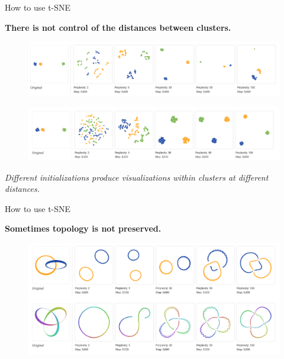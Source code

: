 \documentclass[10pt]{beamer}
\theoremstyle{definition}
\newcommand{\1}{\mathbbm{1}}
\begin{document}
\begin{frame}{How to use t-SNE}
  \begin{center}
    \bf
    There is not control of the distances between clusters.
  \end{center}
  \begin{figure}[h]
    \centering
    \includegraphics[scale=0.2, trim=2cm 0 0 2cm]{./pic/cluster_dist1.png}
  \end{figure}
  \begin{figure}[h]
    \centering
    \includegraphics[scale=0.2, trim=2.3cm 0 0 3cm]{./pic/cluster_dist2.png}
  \end{figure}
  {\it Different initializations produce visualizations within clusters at
  different distances.}
\end{frame}
\begin{frame}{How to use t-SNE}
  \begin{center}
    \bf Sometimes topology is not preserved.
  \end{center}
  \begin{figure}[h!]
    \centering
    \includegraphics[scale=0.2, trim = 2cm 0 0 0]{pic/topology.png}
  \end{figure}
\end{frame}
\end{document}
